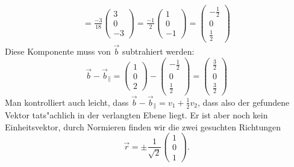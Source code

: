 \begin{loesung}
\begin{teilaufgaben}
\begin{align*}
=
\frac{-3}{18}\begin{pmatrix}3\\0\\-3\end{pmatrix}
=
\frac{-1}{2}\begin{pmatrix}1\\0\\-1\end{pmatrix}
=
\begin{pmatrix}-\frac12\\0\\\frac12\end{pmatrix}
\end{align*}
Diese Komponente muss von $\vec b$ subtrahiert werden:
\[
\vec b -\vec b_{\|}
=\begin{pmatrix}1\\0\\2\end{pmatrix}
-
\begin{pmatrix}-\frac12\\0\\\frac12\end{pmatrix}
=
\begin{pmatrix}\frac32\\0\\\frac32\end{pmatrix}
\]
Man kontrolliert auch leicht, dass
$\vec b -\vec b_{\|} = v_1+\frac12v_2$, dass also der gefundene
Vektor tats"achlich in der verlangten Ebene liegt.
Er ist aber noch kein Einheitsvektor, durch Normieren finden wir
die zwei gesuchten Richtungen
\[
\vec r=\pm\frac1{\sqrt{2}}\begin{pmatrix}1\\0\\1\end{pmatrix}.
\]
\end{teilaufgaben}
\end{loesung}

